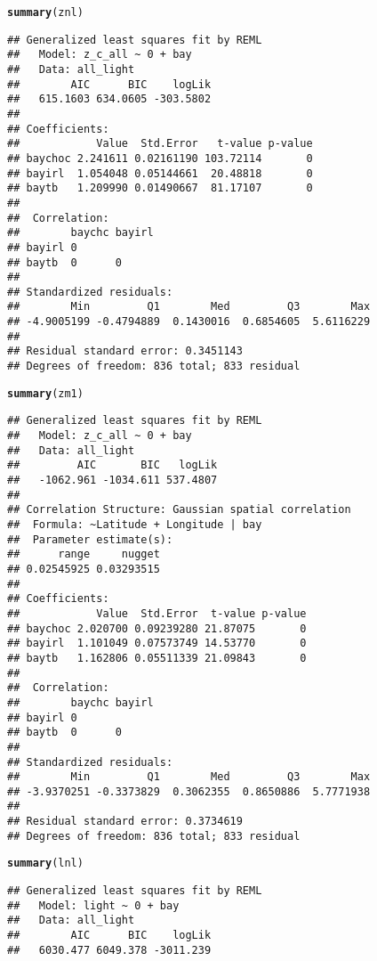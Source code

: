 \documentclass{article}\usepackage[]{graphicx}\usepackage[]{color}
\makeatletter
\newcommand{\hlstd}[1]{\textcolor[rgb]{0.345,0.345,0.345}{#1}}%
\newcommand{\hlkwd}[1]{\textcolor[rgb]{0.737,0.353,0.396}{\textbf{#1}}}%
\newenvironment{kframe}{%
 \def\at@end@of@kframe{}%
 \ifinner\ifhmode%
  \def\at@end@of@kframe{\end{minipage}}%
  \begin{minipage}{\columnwidth}%
 \fi\fi%
 \def\FrameCommand##1{\hskip\@totalleftmargin \hskip-\fboxsep
 \colorbox{shadecolor}{##1}\hskip-\fboxsep
     \hskip-\linewidth \hskip-\@totalleftmargin \hskip\columnwidth}%
 \MakeFramed {\advance\hsize-\width
   \@totalleftmargin\z@ \linewidth\hsize
   \@setminipage}}%
 {\par\unskip\endMakeFramed%
 \at@end@of@kframe}
\newenvironment{knitrout}{}{} %
\makeatother
\begin{document}
\begin{knitrout}
\color{fgcolor}\begin{kframe}
\begin{alltt}
\hlkwd{summary}\hlstd{(znl)}
\end{alltt}
\begin{verbatim}
## Generalized least squares fit by REML
##   Model: z_c_all ~ 0 + bay 
##   Data: all_light 
##        AIC      BIC    logLik
##   615.1603 634.0605 -303.5802
## 
## Coefficients:
##            Value  Std.Error   t-value p-value
## baychoc 2.241611 0.02161190 103.72114       0
## bayirl  1.054048 0.05144661  20.48818       0
## baytb   1.209990 0.01490667  81.17107       0
## 
##  Correlation: 
##        baychc bayirl
## bayirl 0            
## baytb  0      0     
## 
## Standardized residuals:
##        Min         Q1        Med         Q3        Max 
## -4.9005199 -0.4794889  0.1430016  0.6854605  5.6116229 
## 
## Residual standard error: 0.3451143 
## Degrees of freedom: 836 total; 833 residual
\end{verbatim}
\begin{alltt}
\hlkwd{summary}\hlstd{(zm1)}
\end{alltt}
\begin{verbatim}
## Generalized least squares fit by REML
##   Model: z_c_all ~ 0 + bay 
##   Data: all_light 
##         AIC       BIC   logLik
##   -1062.961 -1034.611 537.4807
## 
## Correlation Structure: Gaussian spatial correlation
##  Formula: ~Latitude + Longitude | bay 
##  Parameter estimate(s):
##      range     nugget 
## 0.02545925 0.03293515 
## 
## Coefficients:
##            Value  Std.Error  t-value p-value
## baychoc 2.020700 0.09239280 21.87075       0
## bayirl  1.101049 0.07573749 14.53770       0
## baytb   1.162806 0.05511339 21.09843       0
## 
##  Correlation: 
##        baychc bayirl
## bayirl 0            
## baytb  0      0     
## 
## Standardized residuals:
##        Min         Q1        Med         Q3        Max 
## -3.9370251 -0.3373829  0.3062355  0.8650886  5.7771938 
## 
## Residual standard error: 0.3734619 
## Degrees of freedom: 836 total; 833 residual
\end{verbatim}
\begin{alltt}
\hlkwd{summary}\hlstd{(lnl)}
\end{alltt}
\begin{verbatim}
## Generalized least squares fit by REML
##   Model: light ~ 0 + bay 
##   Data: all_light 
##        AIC      BIC    logLik
##   6030.477 6049.378 -3011.239

\end{verbatim}
\end{kframe}
\end{knitrout}
\end{document}
